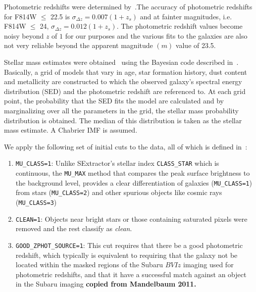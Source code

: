 \documentclass[twocolumn,useAMS,usenatbib]{mn2e}
\newcommand{\rachel}[1]{{\textcolor{red}{#1}}}
\begin{document}
Photometric redshifts were determined by~\cite{COSMOS_Photoz_30band}.The accuracy of photometric redshifts for F814W $\le$ 22.5 is $\sigma_{\Delta z} = 0.007(1+z_s)$ and at fainter magnitudes, i.e. F814W $\le$ 24, $\sigma_{\Delta z} = 0.012(1+z_s)$.
The photometric redshift values become noisy beyond $z$ of $1$ for our purposes and the various fits to the galaxies are also not very reliable beyond the apparent magnitude $(m)$ value of 23.5.

Stellar mass estimates were obtained~\citep{COSMOS_XRAY} using the Bayesian code described in~\cite{KEVIN_MSTAR}. Basically, a grid of models that vary in age, star formation history, dust content and metallicity
are constructed to which the observed galaxy's spectral energy distribution (SED) and the photometric redshift are referenced to. At each grid point, the probability that the 
SED fits the model are calculated and by marginalizing over all the parameters in the grid, the stellar mass probability distribution is obtained. The median of this distribution
is taken as the stellar mass estimate. A Chabrier IMF is assumed.


We apply the following set of initial cuts to the data, all of which is defined in~\cite{COSMOS_Alexie}:
\begin{enumerate}
 \item \texttt{MU\_CLASS=1}: Unlike SExtractor's stellar index \texttt{CLASS\_STAR} which is continuous, the \texttt{MU\_MAX} method that compares the peak surface brightness to the background level,
 provides a clear differentiation of galaxies (\texttt{MU\_CLASS=1}) from stars (\texttt{MU\_CLASS=2}) and other spurious objects like cosmic rays (\texttt{MU\_CLASS=3})
 
 \item \texttt{CLEAN=1}: Objects near bright stars or those containing saturated pixels were removed and the rest classify as \emph{clean}.
 
 \item \texttt{GOOD\_ZPHOT\_SOURCE=1}: This cut requires that there be a good photometric redshift, which typically is equivalent to requiring that the galaxy not be located within
                                       the masked regions of the Subaru $BVIz$ imaging used for photometric redshifts, and that it have a successful match against an object in the Subaru imaging
                                       {\bf copied from Mandelbaum 2011.}
\end{enumerate}
  
\end{document}
